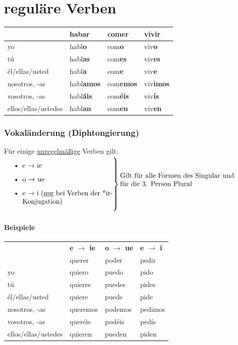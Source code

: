 \documentclass{../spanish_summary}
\begin{document}
\chapter*{reguläre Verben}
\begin{longtable}{p{} | C{.10\textwidth}  | C{.10\textwidth}  | C{.10\textwidth}} 
\textbf{~}     & hab\textbf{ar} & com\textbf{er} & viv\textbf{ir}                                       \\ \hline
\hline
\endhead %
yo & habl\textbf{o} & com\textbf{o} & viv\textbf{o} \\
tú & habl\textbf{as} & com\textbf{es} &  viv\textbf{es} \\
él/ellas/usted &  habl\textbf{a} & com\textbf{e} &  viv\textbf{e} \\
nosotros, -as &  habl\textbf{amos} & com\textbf{emos} &  viv\textbf{imos} \\
vosotros, -as &  habl\textbf{áis} & com\textbf{éis} &  viv\textbf{ís} \\
ellos/ellas/ustedes &  habl\textbf{an} & com\textbf{en} &  viv\textbf{en} \\
\end{longtable}

\subsection*{Vokaländerung (Diphtongierung) }
Für einige \underline{unregelmäßige} Verben gilt:\\[2ex]
$
\left.\parbox{0.45\textwidth}{%
\begin{itemize}
  \item e $\rightarrow$ ie
  \item o $\rightarrow$ ue
  \item e $\rightarrow$ i (\underline{nur} bei Verben der *ir-Konjugation)
\end{itemize}
}\right\} \vbox{\noindent Gilt für alle Formen des Singular und\\für die 3. Person Plural}
$
\subsubsection*{Beispiele}
\begin{longtable}{p{} | C{.10\textwidth}  | C{.10\textwidth}  | C{.10\textwidth}} 
~ & \textbf{e $\rightarrow$ ie} & \textbf{o $\rightarrow$ ue} & \textbf{e $\rightarrow$ i}\\
~ & querer & poder & pedir                                   \\ \hline
\hline
\endhead %
yo & quiero & puedo & pido \\
tú & quieres & puedes &  pides \\
él/ellas/usted &  quiere & puede &  pide \\
nosotros, -as &  queremos & podemos &  pedimos \\
vosotros, -as &  queréis & podéis &  pedís \\
ellos/ellas/ustedes &  quieren & pueden &  piden \\
\end{longtable}
\end{document}
